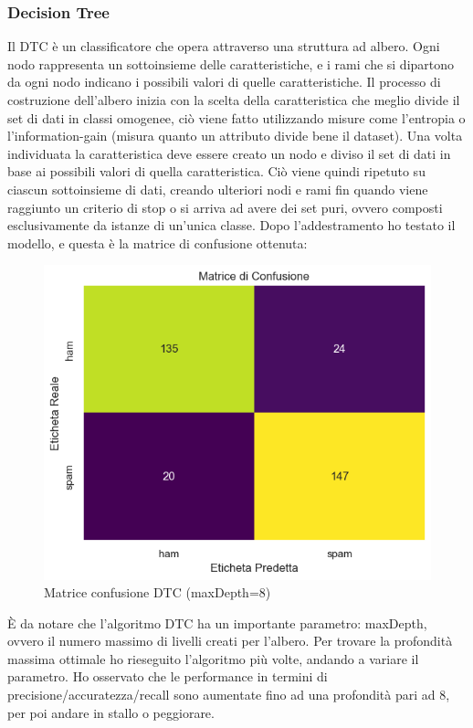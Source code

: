 \documentclass[]{article}
\begin{document}
                \subsubsection{Decision Tree}
                    Il DTC \cite{wikiDTC} è un classificatore che opera attraverso una struttura ad albero. Ogni nodo rappresenta un sottoinsieme delle caratteristiche, e i rami che si dipartono da ogni nodo indicano i possibili valori di quelle caratteristiche.
                    Il processo di costruzione dell'albero inizia con la scelta della caratteristica che meglio divide il set di dati in classi omogenee, ciò viene fatto utilizzando misure come l'entropia o l'information-gain (misura quanto un attributo divide bene il dataset). Una volta individuata la caratteristica deve essere creato un nodo e  diviso il set di dati in base ai possibili valori di quella caratteristica. Ciò viene quindi ripetuto su ciascun sottoinsieme di dati, creando ulteriori nodi e rami
                    fin quando viene raggiunto un criterio di stop o si arriva ad avere dei set puri, ovvero composti esclusivamente da istanze di un'unica classe.
                    Dopo l'addestramento ho testato il modello, e questa è la matrice di confusione ottenuta:
                    \begin{figure}[H]
                        \centering
                        \includegraphics[width=0.6\linewidth]{images/dtcResult.png}
                        \caption{Matrice confusione DTC (maxDepth=8)}
                        \label{fig:enter-label}
                    \end{figure}
                    È da notare che l'algoritmo DTC ha un importante parametro: maxDepth, ovvero il numero massimo di livelli creati per l'albero. Per trovare la profondità massima ottimale ho rieseguito l'algoritmo più volte, andando a variare il parametro. Ho osservato che le performance in termini di precisione/accuratezza/recall sono aumentate fino ad una profondità pari ad 8, per poi andare in stallo o peggiorare.
\end{document}
